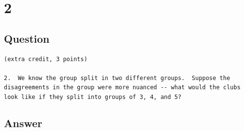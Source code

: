 \documentclass[letterpaper,11pt]{article}
\begin{document}
\clearpage


\section*{2}

\subsection*{Question}

\begin{verbatim}
(extra credit, 3 points)

2.  We know the group split in two different groups.  Suppose the
disagreements in the group were more nuanced -- what would the clubs
look like if they split into groups of 3, 4, and 5?
\end{verbatim}

\clearpage
\subsection*{Answer}
\end{document}
